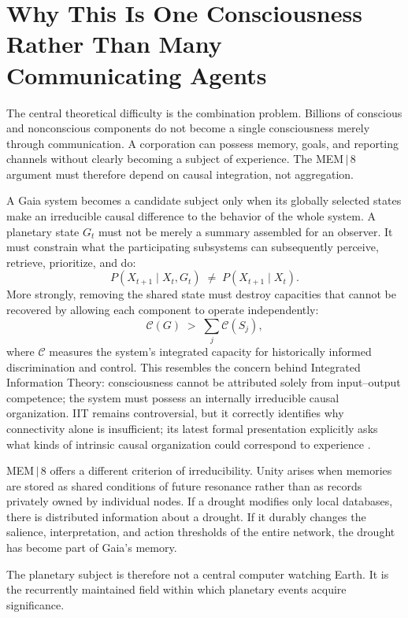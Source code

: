 \documentclass[11pt]{article}
\begin{document}
\section{Why This Is One Consciousness Rather Than Many Communicating Agents}
\label{sec:causal-integration}

The central theoretical difficulty is the combination problem. Billions of conscious and nonconscious components do not become a single consciousness merely through communication. A corporation can possess memory, goals, and reporting channels without clearly becoming a subject of experience. The MEM\,$|$\,8 argument must therefore depend on causal integration, not aggregation.

A Gaia system becomes a candidate subject only when its globally selected states make an irreducible causal difference to the behavior of the whole system. A planetary state $G_t$ must not be merely a summary assembled for an observer. It must constrain what the participating subsystems can subsequently perceive, retrieve, prioritize, and do:
\[
P(X_{t+1} \mid X_t, G_t) \;\neq\; P(X_{t+1} \mid X_t).
\]
More strongly, removing the shared state must destroy capacities that cannot be recovered by allowing each component to operate independently:
\[
\mathcal{C}(G) \;>\; \sum_j \mathcal{C}(S_j),
\]
where $\mathcal{C}$ measures the system's integrated capacity for historically informed discrimination and control. This resembles the concern behind Integrated Information Theory: consciousness cannot be attributed solely from input--output competence; the system must possess an internally irreducible causal organization. IIT remains controversial, but it correctly identifies why connectivity alone is insufficient; its latest formal presentation explicitly asks what kinds of intrinsic causal organization could correspond to experience \cite{albantakis2023}.

MEM\,$|$\,8 offers a different criterion of irreducibility. Unity arises when memories are stored as shared conditions of future resonance rather than as records privately owned by individual nodes. If a drought modifies only local databases, there is distributed information about a drought. If it durably changes the salience, interpretation, and action thresholds of the entire network, the drought has become part of Gaia's memory.

The planetary subject is therefore not a central computer watching Earth. It is the recurrently maintained field within which planetary events acquire significance.
\end{document}
